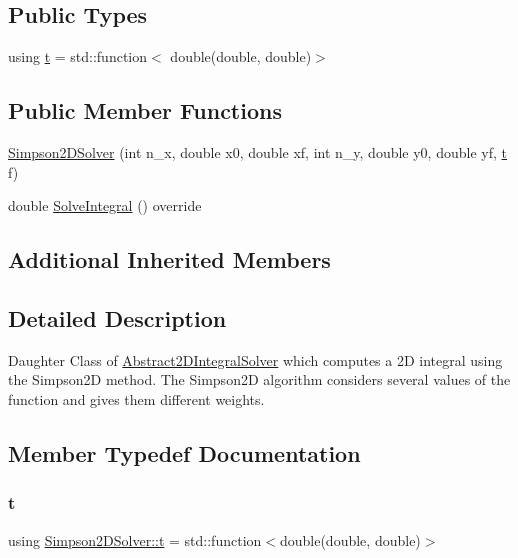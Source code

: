 \subsection*{Public Types}
\begin{DoxyCompactItemize}
\item 
using \hyperlink{class_simpson2_d_solver_a0267d4b1dec3215e954667b1699e687f}{t} = std\+::function$<$ double(double, double)$>$
\end{DoxyCompactItemize}
\subsection*{Public Member Functions}
\begin{DoxyCompactItemize}
\item 
\hyperlink{class_simpson2_d_solver_a16ade6b2b5e89031c452f11e70c2f8fb}{Simpson2\+D\+Solver} (int n\+\_\+x, double x0, double xf, int n\+\_\+y, double y0, double yf, \hyperlink{class_abstract2_d_integral_solver_ab660df32953c6b0f9f3a45a8720eaeb3}{t} f)
\item 
double \hyperlink{class_simpson2_d_solver_a3fc19037fef83ad05381138d9f7da939}{Solve\+Integral} () override
\end{DoxyCompactItemize}
\subsection*{Additional Inherited Members}


\subsection{Detailed Description}
Daughter Class of \hyperlink{class_abstract2_d_integral_solver}{Abstract2\+D\+Integral\+Solver} which computes a 2D integral using the Simpson2D method. The Simpson2D algorithm considers several values of the function and gives them different weights. 

\subsection{Member Typedef Documentation}
\mbox{\label{class_simpson2_d_solver_a0267d4b1dec3215e954667b1699e687f}} 
\subsubsection{\texorpdfstring{t}{t}}
{\footnotesize\ttfamily using \hyperlink{class_simpson2_d_solver_a0267d4b1dec3215e954667b1699e687f}{Simpson2\+D\+Solver\+::t} =  std\+::function$<$double(double, double)$>$}

